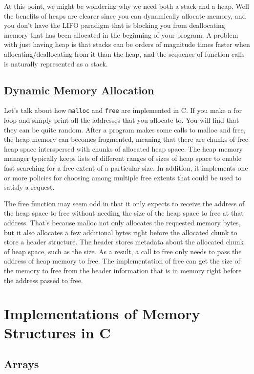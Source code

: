 \documentclass{article}
\begin{document}
    At this point, we might be wondering why we need both a stack and a heap. Well the benefits of heaps are clearer since you can dynamically allocate memory, and you don't have the LIFO paradigm that is blocking you from deallocating memory that has been allocated in the beginning of your program. A problem with just having heap is that stacks can be orders of magnitude times faster when allocating/deallocating from it than the heap, and the sequence of function calls is naturally represented as a stack. 

  \subsection{Dynamic Memory Allocation}

    Let's talk about how \texttt{malloc} and \texttt{free} are implemented in C. If you make a for loop and simply print all the addresses that you allocate to. You will find that they can be quite random. After a program makes some calls to malloc and free, the heap memory can becomes fragmented, meaning that there are chunks of free heap space interspersed with chunks of allocated heap space. The heap memory manager typically keeps lists of different ranges of sizes of heap space to enable fast searching for a free extent of a particular size. In addition, it implements one or more policies for choosing among multiple free extents that could be used to satisfy a request.

    The free function may seem odd in that it only expects to receive the address of the heap space to free without needing the size of the heap space to free at that address. That’s because malloc not only allocates the requested memory bytes, but it also allocates a few additional bytes right before the allocated chunk to store a header structure. The header stores metadata about the allocated chunk of heap space, such as the size. As a result, a call to free only needs to pass the address of heap memory to free. The implementation of free can get the size of the memory to free from the header information that is in memory right before the address passed to free.

\section{Implementations of Memory Structures in C} 

  \subsection{Arrays}
\end{document}
